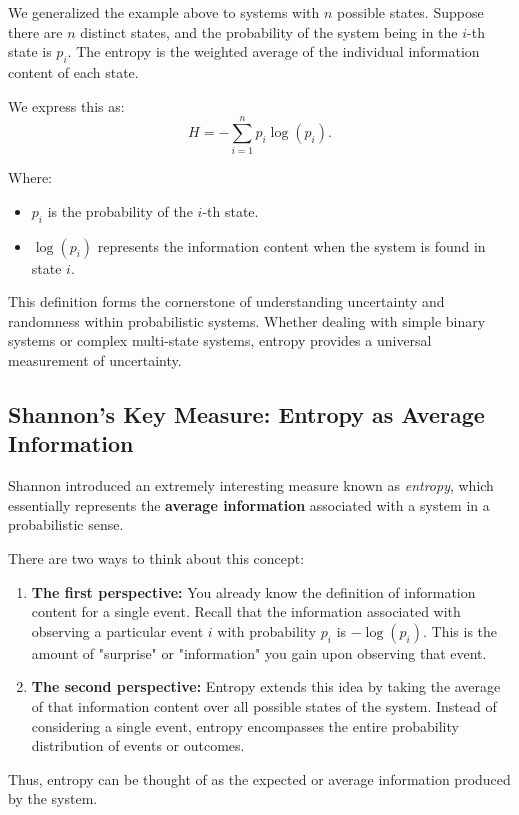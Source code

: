 \documentclass[12pt,a4paper]{article}
\begin{document}
We generalized the example above to systems with $n$ possible states. Suppose there are $n$ distinct states, and the probability of the system being in the $i$-th state is $p_i$. The entropy is the weighted average of the individual information content of each state.

We express this as:
\[
H = - \sum_{i=1}^{n} p_i \log(p_i).
\]

Where:
\begin{itemize}
    \item $p_i$ is the probability of the $i$-th state.
    \item $\log(p_i)$ represents the information content when the system is found in state $i$.
\end{itemize}

This definition forms the cornerstone of understanding uncertainty and randomness within probabilistic systems. Whether dealing with simple binary systems or complex multi-state systems, entropy provides a universal measurement of uncertainty.

\subsection{Shannon's Key Measure: Entropy as Average Information}

Shannon introduced an extremely interesting measure known as \emph{entropy}, which essentially represents the \textbf{average information} associated with a system in a probabilistic sense.

There are two ways to think about this concept:

\begin{enumerate}
    \item \textbf{The first perspective:} You already know the definition of information content for a single event. Recall that the information associated with observing a particular event $i$ with probability $p_i$ is $-\log(p_i)$. This is the amount of "surprise" or "information" you gain upon observing that event.
    
    \item \textbf{The second perspective:} Entropy extends this idea by taking the average of that information content over all possible states of the system. Instead of considering a single event, entropy encompasses the entire probability distribution of events or outcomes.
\end{enumerate}

Thus, entropy can be thought of as the expected or average information produced by the system.
\end{document}
